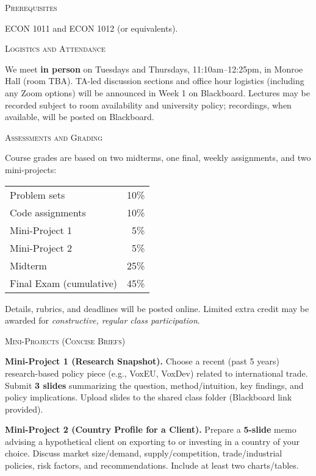 \documentclass[11pt]{article}
\begin{document}
\bigskip

\noindent\textsc{Prerequisites}
\smallskip

ECON 1011 and ECON 1012 (or equivalents).

\bigskip

\noindent\textsc{Logistics and Attendance}

\smallskip
We meet \textbf{in person} on Tuesdays and Thursdays, 11:10am--12:25pm, in Monroe Hall (room TBA). TA-led discussion sections and office hour logistics (including any Zoom options) will be announced in Week 1 on Blackboard. Lectures may be recorded subject to room availability and university policy; recordings, when available, will be posted on Blackboard.

\bigskip

\noindent\textsc{Assessments and Grading}

\smallskip
Course grades are based on two midterms, one final, weekly assignments, and two mini-projects:

\medskip
\begin{tabular}{l r}
Problem sets & 10\% \\
Code assignments & 10\% \\
Mini-Project 1 & 5\% \\
Mini-Project 2 & 5\% \\
Midterm & 25\% \\
Final Exam (cumulative) & 45\%
\end{tabular}

\medskip
\noindent Details, rubrics, and deadlines will be posted online. Limited extra credit may be awarded for \textit{constructive, regular class participation}.

\bigskip

\noindent\textsc{Mini-Projects (Concise Briefs)}

\smallskip
\textbf{Mini-Project 1 (Research Snapshot).} Choose a recent (past 5 years) research-based policy piece (e.g., VoxEU, VoxDev) related to international trade. Submit \textbf{3 slides} summarizing the question, method/intuition, key findings, and policy implications. Upload slides to the shared class folder (Blackboard link provided). 

\smallskip
\textbf{Mini-Project 2 (Country Profile for a Client).} Prepare a \textbf{5-slide} memo advising a hypothetical client on exporting to or investing in a country of your choice. Discuss market size/demand, supply/competition, trade/industrial policies, risk factors, and recommendations. Include at least two charts/tables.
\end{document}
